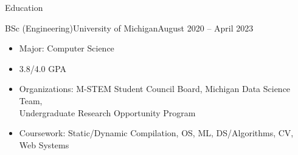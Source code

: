 \documentclass[]{mcdowellcv}
\begin{document}
	\makeheader
	
	\begin{cvsection}{Education}
		\begin{cvsubsection}{BSc (Engineering)}{University of Michigan}{August 2020 -- April 2023}
			\small{
				\begin{itemize}
					\item Major: Computer Science
					\item 3.8/4.0 GPA
					\item Organizations: M-STEM Student Council Board, Michigan Data Science Team,\\Undergraduate Research Opportunity Program
					\item Coursework: Static/Dynamic Compilation, OS, ML, DS/Algorithms, CV, Web Systems
				\end{itemize}
			}
		\end{cvsubsection}
	\end{cvsection}
\end{document}
